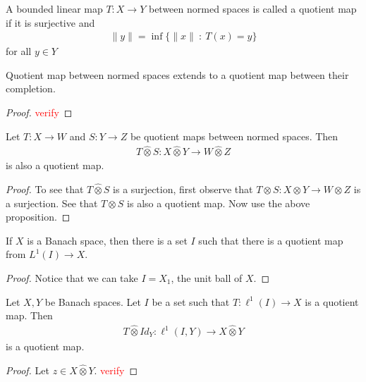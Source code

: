 

\begin{definition}
  A bounded linear map $T: X \to Y$ between normed spaces is called a
  quotient map if it is surjective and
  \begin{align*}
    \|y\| = \inf \{ \|x\|  \ : \ T(x) = y \}
  \end{align*}
  for all $y \in Y$
\end{definition}

\begin{proposition}
  Quotient map between normed spaces extends to a quotient map between
  their completion.
\end{proposition}
\begin{proof}
  \textcolor{red}{verify}
\end{proof}

\begin{theorem}
  Let $T : X \to W$ and $S: Y \to Z$ be quotient maps between normed
  spaces. Then
  \begin{align*}
    T \hat{\otimes} S : X \hat{\otimes} Y \to W \hat{\otimes} Z
  \end{align*}
  is also a quotient map.
\end{theorem}
\begin{proof}
  To see that $T \hat{\otimes} S$ is a surjection, first observe that
  $T \otimes S : X \otimes Y \to W \otimes Z$ is a surjection.
  See that $ T \otimes S$ is also a quotient map. Now use the above proposition.
\end{proof}

\begin{note}
  If $X$ is a Banach space, then there is a set $I$ such that there
  is a quotient map from $L^{1}(I) \to X$.
\end{note}
\begin{proof}
  Notice that we can take $I = X_1$, the unit ball of $X$.
\end{proof}

\begin{proposition}
  Let $X, Y $ be Banach spaces. Let $I$ be a set such that $T:
  \ell^{1}(I) \to X$ is a quotient map. Then
  \begin{align*}
    T \hat{\otimes} Id_Y : \ell^{1}(I, Y) \to X \hat{\otimes} Y
  \end{align*}
  is a quotient map.
\end{proposition}
\begin{proof}
  Let $z \in X \hat{\otimes} Y$. \textcolor{red}{verify}
\end{proof}
